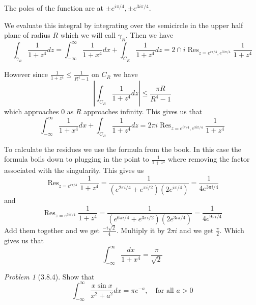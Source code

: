 \documentclass[10pt]{article}
\newcommand{\sk}{\vskip 10mm}
\DeclareMathOperator{\Res}{Res}
\theoremstyle{remark}
\newtheorem{problem}{Problem}
\theoremstyle{remark}
\begin{document}
The poles of the function are at $\pm e^{i\pi/4},\pm e^{3i\pi/4}$.

We evaluate this integral by integrating over the semicircle in the
upper half plane of radius $R$ which we will call $\gamma_R$. Then we have
\[
  \int_{\gamma_R}\frac{1}{1+z^4} dz = \int_{-\infty}^\infty \frac{1}{1+x^4}dx+\int_{C_R}\frac{1}{1+z^4}dz= 2\cap i\Res_{z=e^{i\pi/4},e^{3i\pi/4}}\frac{1}{1+z^4}
\]

However since $\frac{1}{1+z^4}\leq\frac{1}{R^4-1}$ on $C_R$ we have
\[
  \left|\int_{C_R}\frac{1}{1+z^4}dz\right|\leq\frac{\pi R}{R^4-1}
\]
which approaches $0$ as $R$ approaches infinity. This gives us that
\[
  \int_{-\infty}^\infty \frac{1}{1+x^4}dx+\int_{C_R}\frac{1}{1+z^4}dz= 2\pi i\Res_{z=e^{i\pi/4},e^{3i\pi/4}}\frac{1}{1+z^4}
\]

To calculate the residues we use the formula from the book. In this case the
formula boils down to plugging in the point to $\frac{1}{1+z^4}$ where removing the factor
associated with the singularity. This gives us
\[
  \Res_{z=e^{i\pi/4}}\frac{1}{1+z^4}=\frac{1}{(e^{2\pi i/4}+e^{\pi i/2})(2e^{i\pi/4})}=\frac{1}{4e^{3\pi i/4}}
\]
and
\[
  \Res_{z=e^{3i\pi/4}}\frac{1}{1+z^4}=\frac{1}{(e^{6\pi i/4}+e^{3\pi i/2})(2e^{3i\pi/4})}=\frac{1}{4e^{9\pi i/4}}
\]
Add them together and we get $\frac{-i\sqrt{2}}{4}$. Multiply it by $2\pi i$ and
we get $\frac{\pi}{2}$. Which gives us that
\[
  \int_{-\infty}^\infty \frac{dx}{1+x^4} = \frac{\pi}{\sqrt{2}}
\]

\sk

\begin{problem}[3.8.4]
  Show that
  \[
    \int_{-\infty}^\infty\frac{x\sin x}{x^2+a^2}dx=\pi e^{-a},\quad \text{for all $a>0$}
  \]
\end{problem}
\end{document}
